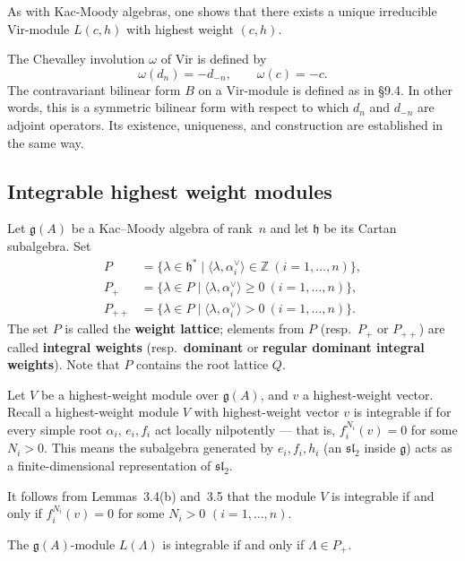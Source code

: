 \documentclass[12pt]{article}
\begin{document}
As with Kac-Moody algebras, one shows that there exists a unique irreducible
$\mathrm{Vir}$-module $L(c,h)$ with highest weight $(c,h)$.

The Chevalley involution $\omega$ of $\mathrm{Vir}$ is defined by
\begin{equation}\label{eq:9.14.4}
\omega(d_n) = -d_{-n}, \qquad \omega(c) = -c.
\end{equation}
The contravariant bilinear form $B$ on a $\mathrm{Vir}$-module is
defined as in \S9.4. In other words, this is a symmetric bilinear
form with respect to which $d_n$ and $d_{-n}$ are adjoint operators.
Its existence, uniqueness, and construction are established in the
same way.
\subsection{Integrable highest weight modules}
Let $\mathfrak{g}(A)$ be a Kac--Moody algebra of rank~$n$ and let
$\mathfrak{h}$ be its Cartan subalgebra. Set
\[
\begin{aligned}
P &= \{\lambda \in \mathfrak{h}^* \mid \langle \lambda, \alpha_i^\vee \rangle \in \mathbb{Z}
\ (i=1,\dots,n)\},\\
P_+ &= \{\lambda \in P \mid \langle \lambda, \alpha_i^\vee \rangle \ge 0
\ (i=1,\dots,n)\},\\
P_{++} &= \{\lambda \in P \mid \langle \lambda, \alpha_i^\vee \rangle > 0
\ (i=1,\dots,n)\}.
\end{aligned}
\]
The set $P$ is called the \textbf{weight lattice};
elements from $P$ (resp.\ $P_+$ or $P_{++}$) are called
\textbf{integral weights} (resp.\ \textbf{dominant} or
\textbf{regular dominant integral weights}).
Note that $P$ contains the root lattice $Q$.

Let $V$ be a highest-weight module over $\mathfrak{g}(A)$,
and $v$ a highest-weight vector. Recall a highest-weight module $V$ with highest-weight vector $v$ is integrable if for every simple root $\alpha_i$, $e_i, f_i$ act locally nilpotently — that is, $f_i^{N_i}(v)=0$ for some $N_i>0$. This means the subalgebra generated by $e_i, f_i, h_i$ (an $\mathfrak{sl}_2$ inside $\mathfrak{g}$) acts as a finite-dimensional representation of $\mathfrak{sl}_2$.


It follows from Lemmas~3.4(b) and~3.5 that the module $V$ is
integrable if and only if $f_i^{N_i}(v) = 0$ for some $N_i > 0$
$(i=1,\dots,n)$.

\begin{lemma}[10.1]
The $\mathfrak{g}(A)$-module $L(\Lambda)$ is integrable
if and only if $\Lambda \in P_+$.
\end{lemma}
\end{document}
